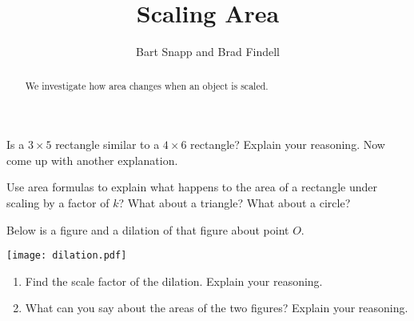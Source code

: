 \documentclass[nooutcomes]{ximera}
\title{Scaling Area}
\author{Bart Snapp and Brad Findell}
\begin{document}
\begin{abstract}
  We investigate how area changes when an object is scaled.
\end{abstract}
\maketitle


\begin{problem}
Is a $3\times 5$ rectangle similar to a $4\times 6$ rectangle?  Explain your reasoning.  Now come up with another explanation. 
\vfill
\end{problem}


\begin{problem}
Use area formulas to explain what happens to the area of a rectangle under scaling by a factor of $k$?  What about a triangle?  What about a circle?  
\vfill
\end{problem}

\newpage

\begin{problem}
Below is a figure and a dilation of that figure about point $O$.  
\begin{image}
\texttt{[image: dilation.pdf]}
\end{image}
\begin{enumerate}
\item Find the scale factor of the dilation.  Explain your reasoning. 
\item What can you say about the areas of the two figures?  Explain your reasoning. 
\end{enumerate}
\vfill
\end{problem}


\end{document}
